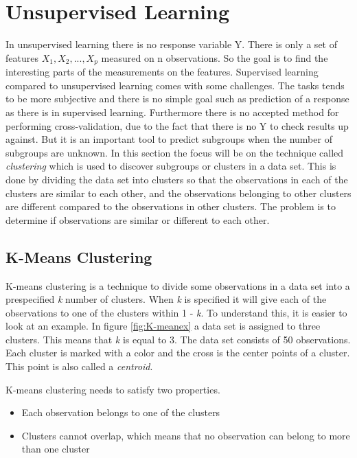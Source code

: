 \chapter{Unsupervised Learning}
\label{chp:unsuplea}
In unsupervised learning there is no response variable Y. There is only a set of features $X_1, X_2,..., X_p$ measured on n observations. So the goal is to find the interesting parts of the measurements on the features.
Supervised learning compared to unsupervised learning comes with some challenges. The tasks tends to be more subjective and there is no simple goal such as prediction of a response as there is in supervised learning. Furthermore there is no accepted method for performing cross-validation, due to the fact that there is no Y to check results up against.
But it is an important tool to predict subgroups when the number of subgroups are unknown.
In this section the focus will be on the  technique called \emph{clustering} which is used to discover subgroups or clusters in a data set. 
This is done by dividing the data set into clusters so that the observations in each of the clusters are similar to each other, and the observations belonging to other clusters are different compared to the observations in other clusters.
The problem is to determine if observations are similar or different to each other.
 
\section{K-Means Clustering}
\label{chp:clus}
K-means clustering is a technique to divide some observations in a data set into a prespecified \emph{k} number of clusters. When \emph{k} is specified it will give each of the observations to one of the clusters within 1 - \emph{k}. To understand this, it is easier to look at an example. In figure \ref{fig:K-meanex} a data set is assigned to three clusters. This means that \emph{k} is equal to 3. The data set consists of 50 observations. Each cluster is marked with a color and the cross is the center points of a cluster. This point is also called a \emph{centroid}.


K-means clustering needs to satisfy two properties. 
\begin{itemize}
	\item Each observation belongs to one of the clusters
	\item Clusters cannot overlap, which means that no observation can belong to more than one cluster
\end{itemize} 

